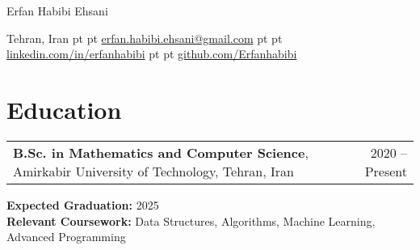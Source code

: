 \documentclass[10pt, a4paper]{article}
\newenvironment{header}{
    \centering
}{\par}
\begin{document}
\begin{header}
    \fontsize{25 pt}{25 pt}\selectfont Erfan Habibi Ehsani

    \vspace{5 pt}

    \normalsize
    Tehran, Iran%
     pt%
    \textbar%
     pt%
    \href{mailto:erfan.habibi.ehsani@gmail.com}{erfan.habibi.ehsani@gmail.com}%
     pt%
    \textbar%
     pt%
    \href{https://www.linkedin.com/in/erfanhabibi/}{linkedin.com/in/erfanhabibi}%
     pt%
    \textbar%
     pt%
    \href{https://github.com/Erfanhabibi}{github.com/Erfanhabibi}%
\end{header}

\vspace{10 pt}

\section{Education}

\begin{tabularx}{\textwidth}{Xr}
    \textbf{B.Sc. in Mathematics and Computer Science}, Amirkabir University of Technology, Tehran, Iran & 2020 -- Present \\
\end{tabularx}

\vspace{0.1 cm}

\textbf{Expected Graduation:} 2025 \\
\textbf{Relevant Coursework:} Data Structures, Algorithms, Machine Learning, Advanced Programming




\end{document}
